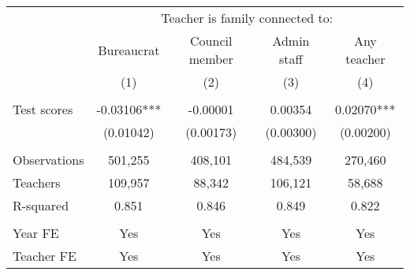 \setlength{\pdfpagewidth}{8.5in} \setlength{\pdfpageheight}{11in}

\begin{tabular}{lcccc} \hline
 & \multicolumn{4}{c}{Teacher is family connected to:} \\
 & Bureaucrat & Council member & Admin staff & Any teacher \\
 & (1) & (2) & (3) & (4) \\
  \hline
 &  &  &  &  \\
Test scores   & -0.03106*** & -0.00001 & 0.00354 & 0.02070*** \\
 & (0.01042) & (0.00173) & (0.00300) & (0.00200) \\
 &  &  &  &  \\
Observations & 501,255 & 408,101 & 484,539 & 270,460 \\
Teachers & 109,957 & 88,342 & 106,121 & 58,688 \\
R-squared & 0.851 & 0.846 & 0.849 & 0.822 \\
 &  &  &  &  \\
Year FE & Yes & Yes & Yes & Yes \\
 Teacher FE & Yes & Yes & Yes & Yes \\ \hline
\end{tabular}
